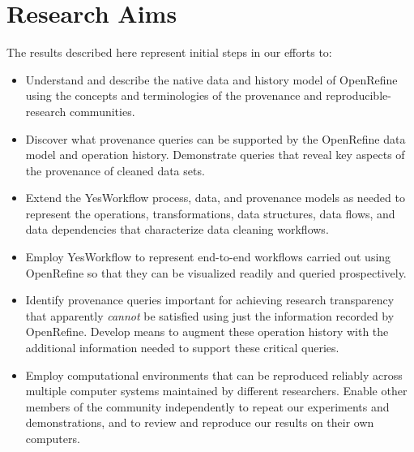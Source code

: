\section{Research Aims}

The results described here represent initial steps in our efforts to:

\begin{itemize}[label=\raisebox{0.25ex}{\tiny$\bullet$}]

\item Understand and describe the native data and history model of OpenRefine using the concepts and terminologies of the provenance and reproducible-research communities.

\item Discover what provenance queries can be supported by the OpenRefine data model and operation history.  Demonstrate queries that reveal key aspects of the provenance of cleaned data sets.

\item Extend the YesWorkflow process, data, and provenance models as needed to represent the operations, transformations, data structures, data flows, and data dependencies that characterize data cleaning workflows.  

\item Employ YesWorkflow to represent end-to-end workflows carried out using OpenRefine so that they can be visualized readily and queried prospectively.

\item Identify provenance queries important for achieving research transparency that apparently \emph{cannot} be satisfied using just the information recorded by OpenRefine. Develop means to augment these operation history with the additional information needed to support these critical queries.

\item Employ computational environments that can be reproduced reliably across multiple computer systems maintained by different researchers.  Enable other members of the community independently to repeat our experiments and demonstrations, and to review and reproduce our results on their own computers.

\end{itemize}
